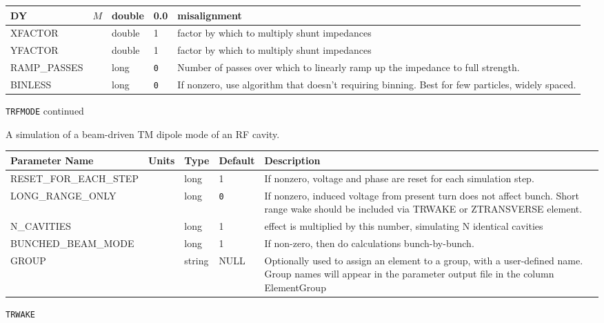 \begin{tabular}{|l|l|l|l|p{\descwidth}|}
DY & $M$ & double &  0.0 & misalignment  \\ \hline 
XFACTOR &  & double &   1 & factor by which to multiply shunt impedances  \\ \hline 
YFACTOR &  & double &   1 & factor by which to multiply shunt impedances  \\ \hline 
RAMP\_PASSES &  & long &  \verb|0| & Number of passes over which to linearly ramp up the impedance to full strength.  \\ \hline 
BINLESS &  & long &  \verb|0| & If nonzero, use algorithm that doesn't requiring binning.  Best for few particles, widely spaced.  \\ \hline 
\end{tabular}

\newpage
\begin{center}{\Large\verb|TRFMODE| continued}\end{center}
A simulation of a beam-driven TM dipole mode of an RF cavity.
\\
\begin{tabular}{|l|l|l|l|p{\descwidth}|} \hline
Parameter Name & Units & Type & Default & Description \\ \hline 
RESET\_FOR\_EACH\_STEP &  & long &   1               & If nonzero, voltage and phase are reset for each simulation step.  \\ \hline 
LONG\_RANGE\_ONLY &  & long &  \verb|0| & If nonzero, induced voltage from present turn does not affect bunch. Short range wake should be included via TRWAKE or ZTRANSVERSE element.  \\ \hline 
N\_CAVITIES &  & long &   1               & effect is multiplied by this number, simulating N identical cavities  \\ \hline 
BUNCHED\_BEAM\_MODE &  & long &   1               & If non-zero, then do calculations bunch-by-bunch.  \\ \hline 
GROUP &  & string & NULL & Optionally used to assign an element to a group, with a user-defined name.  Group names will appear in the parameter output file in the column ElementGroup  \\ \hline 
\end{tabular}

\vspace*{0.5in}

\newpage
\begin{center}{\Large\verb|TRWAKE|}\end{center}
